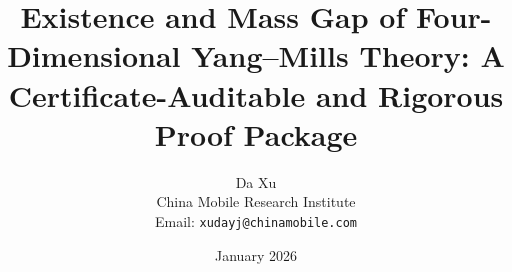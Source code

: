 \title{Existence and Mass Gap of Four-Dimensional Yang--Mills Theory: A Certificate-Auditable and Rigorous Proof Package}
\author{Da Xu \\ China Mobile Research Institute \\ Email: \texttt{xudayj@chinamobile.com}}
\date{January 2026}%
%





